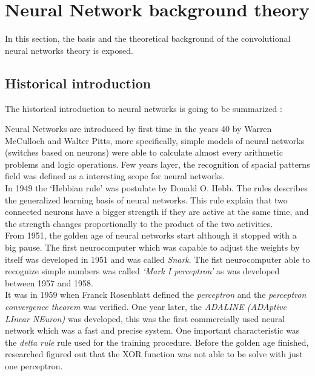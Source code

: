 \section{Neural Network background theory}
In this section, the basis and the theoretical background of the convolutional neural networks theory is exposed.\\

\subsection{Historical introduction}
The historical introduction to neural networks is going to be summarized \cite{BINN}:

Neural Networks are introduced by first time in the years 40 by Warren McCulloch and Walter Pitts, more specifically, simple models of neural networks (switches based on neurons) were able to calculate almost every arithmetic problems and logic operations. Few years layer, the recognition of spacial patterns field was defined as a interesting scope for neural networks.\\

In 1949 the `Hebbian rule' was postulate by Donald O. Hebb. The rules describes the generalized learning basis of neural networks. This rule explain that two connected neurons have  a bigger strength if they are active at the same time, and the strength changes proportionally to the product of the two activities.\\

From 1951, the golden age of neural networks start although it stopped with a big pause. The first neurocomputer which was capable to adjust the weights by itself was developed in 1951 and was called \textit{Snark}. The fist neurocomputer able to recognize simple numbers was called \textit{`Mark I perceptron'} as was developed between 1957 and 1958.\\

It was in 1959 when Franck Rosenblatt  defined the \textit{perceptron} and the \textit{perceptron convergence theorem} was verified. One year later, the \textit{ADALINE (ADAptive LInear NEuron)} was developed, this was the first commercially used neural network which was a fast and precise system. One important characteristic was the \textit{delta rule} rule used for the training procedure. Before the golden age finished, researched figured out that the XOR function was not able to be solve with just one perceptron.\\


